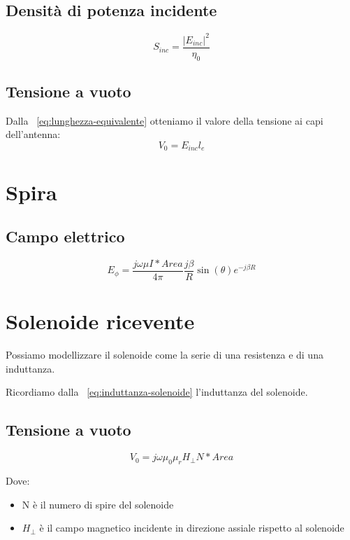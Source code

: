 \documentclass[10pt,a4paper]{report}
\begin{document}
			\subsection{Densità di potenza incidente}

			\begin{equation}
			S_{inc}=\frac{|E_{inc}|^2}{\eta_0}	
			\end{equation}

			\subsection{Tensione a vuoto}			
				Dalla ~\ref{eq:lunghezza-equivalente} otteniamo il valore della tensione ai capi dell'antenna:
				\begin{equation}
				V_0=E_{inc}l_e
				\end{equation}

		\section{Spira}

			\subsection{Campo elettrico}

				\begin{equation}
				E_\phi=\frac{j\omega\mu I*Area}{4\pi}\frac{j\beta}{R}\sin(\theta)e^{-j\beta R}
				\end{equation}

		\section{Solenoide ricevente}
			
			Possiamo modellizzare il solenoide come la serie di una resistenza e di una induttanza.

			Ricordiamo dalla ~\ref{eq:induttanza-solenoide} l'induttanza del solenoide.

		 	\subsection{Tensione a vuoto}

				 \begin{equation}
				 V_0=j\omega\mu_0\mu_rH_{\perp}N*Area
				 \end{equation}

				 Dove:
				 \begin{itemize}
				 \item N è il numero di spire del solenoide 
				 \item $H_{\perp}$ è il campo magnetico incidente in direzione assiale rispetto al solenoide
				 \end{itemize}
\end{document}
